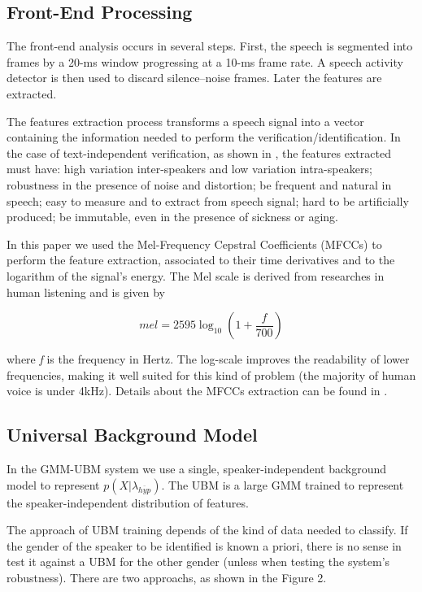 \documentclass[a4paper,twocolumn]{article}
\begin{document}
\subsection{Front-End Processing}

The front-end analysis occurs in several steps. First, the speech is segmented into frames by a 20-ms window progressing at a 10-ms frame rate. A speech activity detector is then used to discard silence–noise frames. Later the features are extracted.

The features extraction process transforms a speech signal into a vector containing the information needed to perform the verification/identification. In the case of text-independent verification, as shown in \cite{pinheiro_2013}, the features extracted must have: high variation inter-speakers and low variation intra-speakers; robustness in the presence of noise and distortion; be frequent and natural in speech; easy to measure and to extract from speech signal; hard to be artificially produced; be immutable, even in the presence of sickness or aging.

In this paper we used the Mel-Frequency Cepstral Coefficients (MFCCs) \cite{davis_mermelstein_1980} to perform the feature extraction, associated to their time derivatives and to the logarithm of the signal's energy. The Mel scale is derived from researches in human listening and is given by

\begin{equation}
    \label{eq:hertz_to_mel}
    mel = 2595\log_{10} (1 + \frac{f}{700})
\end{equation}

\noindent where \textit{f} is the frequency in Hertz. The log-scale improves the readability of lower frequencies, making it well suited for this kind of problem (the majority of human voice is under 4kHz). Details about the MFCCs extraction can be found in \cite{pinheiro_2013}.

\subsection{Universal Background Model}

In the GMM-UBM system we use a single, speaker-independent background model to represent $p(X|\lambda_{\overline{hyp}})$. The UBM is a large GMM trained to represent the speaker-independent distribution of features.

The approach of UBM training depends of the kind of data needed to classify. If the gender of the speaker to be identified is known a priori, there is no sense in test it against a UBM for the other gender (unless when testing the system's robustness). There are two approachs, as shown in the Figure 2.
\end{document}
